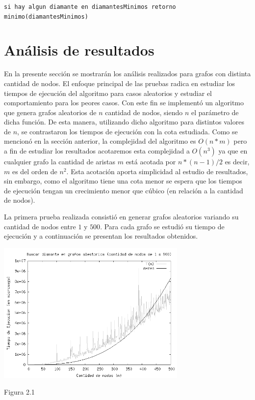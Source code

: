 \documentclass[a4paper,11pt] {article}
\begin{document}
\begin{verbatim}
si hay algun diamante en diamantesMinimos retorno minimo(diamantesMinimos)
\end{verbatim}



\section*{An\'alisis de resultados}

En la presente secci\'on se mostrar\'an los an\'alisis realizados para grafos con distinta cantidad de nodos. El enfoque principal de las pruebas radica en estudiar los tiempos de ejecuci\'on del algoritmo para casos aleatorios y estudiar el comportamiento para los peores casos. Con este fin se implement\'o un algoritmo que genera grafos aleatorios de $n$ cantidad de nodos, siendo $n$ el par\'ametro de dicha funci\'on. De esta manera, utilizando dicho algoritmo para distintos valores de $n$, se contrastaron los tiempos de ejecuci\'on con la cota estudiada. Como se mencion\'o en la secci\'on anterior, la complejidad del algoritmo es $O(n*m)$ pero a fin de estudiar los resultados acotaremos esta complejidad a $O(n^{3})$ ya que en cualquier grafo la cantidad de aristas $m$ est\'a acotada por $n*(n-1)/2$ es decir, $m$ es del orden de $n^{2}$. Esta acotaci\'on aporta simplicidad al estudio de resultados, sin embargo, como el algoritmo tiene una cota menor se espera que los tiempos de ejecuci\'on tengan un crecimiento menor que c\'ubico (en relaci\'on a la cantidad de nodos).

La primera prueba realizada consisti\'o en generar grafos aleatorios variando su cantidad de nodos entre $1$ y $500$. Para cada grafo se estudi\'o su tiempo de ejecuci\'on y a continuaci\'on se presentan los resultados obtenidos.

\begin{center}
 \includegraphics[width=0.7\textwidth]{Plots/Tp2Ej2-Complejidad.png}
\begin{center}
Figura 2.1
\end{center}
\end{center}
\end{document}

